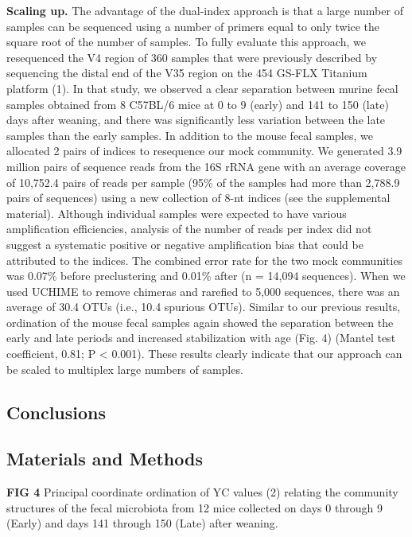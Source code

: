 \documentclass[11pt,]{article}
\begin{document}
\textbf{Scaling up.} The advantage of the dual-index approach is that a
large number of samples can be sequenced using a number of primers equal
to only twice the square root of the number of samples. To fully
evaluate this approach, we resequenced the V4 region of 360 samples that
were previously described by sequencing the distal end of the V35 region
on the 454 GS-FLX Titanium platform (1). In that study, we observed a
clear separation between murine fecal samples obtained from 8 C57BL/6
mice at 0 to 9 (early) and 141 to 150 (late) days after weaning, and
there was significantly less variation between the late samples than the
early samples. In addition to the mouse fecal samples, we allocated 2
pairs of indices to resequence our mock community. We generated 3.9
million pairs of sequence reads from the 16S rRNA gene with an average
coverage of 10,752.4 pairs of reads per sample (95\% of the samples had
more than 2,788.9 pairs of sequences) using a new collection of 8-nt
indices (see the supplemental material). Although individual samples
were expected to have various amplification efficiencies, analysis of
the number of reads per index did not suggest a systematic positive or
negative amplification bias that could be attributed to the indices. The
combined error rate for the two mock communities was 0.07\% before
preclustering and 0.01\% after (n = 14,094 sequences). When we used
UCHIME to remove chimeras and rarefied to 5,000 sequences, there was an
average of 30.4 OTUs (i.e., 10.4 spurious OTUs). Similar to our previous
results, ordination of the mouse fecal samples again showed the
separation between the early and late periods and increased
stabilization with age (Fig. 4) (Mantel test coefficient, 0.81; P
\textless{} 0.001). These results clearly indicate that our approach can
be scaled to multiplex large numbers of samples.

\subsection{Conclusions}\label{conclusions}

\subsection{Materials and Methods}\label{materials-and-methods}

\newpage

\textbf{FIG 4} Principal coordinate ordination of YC values (2) relating
the community structures of the fecal microbiota from 12 mice collected
on days 0 through 9 (Early) and days 141 through 150 (Late) after
weaning.
\end{document}
